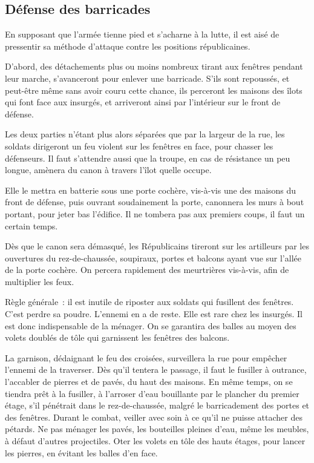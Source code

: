 \documentclass[french,twoside]{book} %
\begin{document}
\subsection[Défense des barricades]{Défense des barricades}
\noindent En supposant que l’armée tienne pied et s’acharne à la lutte, il est aisé de pressentir sa méthode d’attaque contre les positions républicaines.\par
D'abord, des détachements plus ou moins nombreux tirant aux fenêtres pendant leur marche, s’avanceront pour enlever une barricade. S'ils sont repoussés, et peut-être même sans avoir couru cette chance, ils perceront les maisons des îlots qui font face aux insurgés, et arriveront ainsi par l’intérieur sur le front de défense.\par
Les deux parties n’étant plus alors séparées que par la largeur de la rue, les soldats dirigeront un feu violent sur les fenêtres en face, pour chasser les défenseurs. Il faut s’attendre aussi que la troupe, en cas de résistance un peu longue, amènera du canon à travers l’îlot quelle occupe.\par
Elle le mettra en batterie sous une porte cochère, vis-à-vis une des maisons du front de défense, puis ouvrant soudainement la porte, canonnera les murs à bout portant, pour jeter bas l’édifice. Il ne tombera pas aux premiers coups, il faut un certain temps.\par
Dès que le canon sera démasqué, les Républicains tireront sur les artilleurs par les ouvertures du rez-de-chaussée, soupiraux, portes et balcons ayant vue sur l’allée de la porte cochère. On percera rapidement des meurtrières vis-à-vis, afin de multiplier les feux.\par
Règle générale : il est inutile de riposter aux soldats qui fusillent des fenêtres. C'est perdre sa poudre. L'ennemi en a de reste. Elle est rare chez les insurgés. Il est donc indispensable de la ménager. On se garantira des balles au moyen des volets doublés de tôle qui garnissent les fenêtres des balcons.\par
La garnison, dédaignant le feu des croisées, surveillera la rue pour empêcher l’ennemi de la traverser. Dès qu’il tentera le passage, il faut le fusiller à outrance, l’accabler de pierres et de pavés, du haut des maisons. En même temps, on se tiendra prêt à la fusiller, à l’arroser d’eau bouillante par le plancher du premier étage, s’il pénétrait dans le rez-de-chaussée, malgré le barricadement des portes et des fenêtres. Durant le combat, veiller avec soin à ce qu’il ne puisse attacher des pétards. Ne pas ménager les pavés, les bouteilles pleines d’eau, même les meubles, à défaut d’autres projectiles. Oter les volets en tôle des hauts étages, pour lancer les pierres, en évitant les balles d’en face.\par
\end{document}
